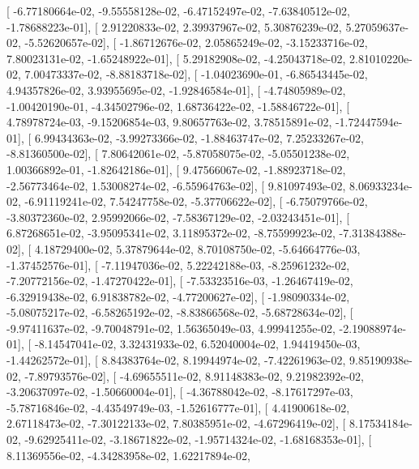 \documentclass{article}
\begin{document}
       [ -6.77180664e-02,  -9.55558128e-02,  -6.47152497e-02,
         -7.63840512e-02,  -1.78688223e-01],
       [  2.91220833e-02,   2.39937967e-02,   5.30876239e-02,
          5.27059637e-02,  -5.52620657e-02],
       [ -1.86712676e-02,   2.05865249e-02,  -3.15233716e-02,
          7.80023131e-02,  -1.65248922e-01],
       [  5.29182908e-02,  -4.25043718e-02,   2.81010220e-02,
          7.00473337e-02,  -8.88183718e-02],
       [ -1.04023690e-01,  -6.86543445e-02,   4.94357826e-02,
          3.93955695e-02,  -1.92846584e-01],
       [ -4.74805989e-02,  -1.00420190e-01,  -4.34502796e-02,
          1.68736422e-02,  -1.58846722e-01],
       [  4.78978724e-03,  -9.15206854e-03,   9.80657763e-02,
          3.78515891e-02,  -1.72447594e-01],
       [  6.99434363e-02,  -3.99273366e-02,  -1.88463747e-02,
          7.25233267e-02,  -8.81360500e-02],
       [  7.80642061e-02,  -5.87058075e-02,  -5.05501238e-02,
          1.00366892e-01,  -1.82642186e-01],
       [  9.47566067e-02,  -1.88923718e-02,  -2.56773464e-02,
          1.53008274e-02,  -6.55964763e-02],
       [  9.81097493e-02,   8.06933234e-02,  -6.91119241e-02,
          7.54247758e-02,  -5.37706622e-02],
       [ -6.75079766e-02,  -3.80372360e-02,   2.95992066e-02,
         -7.58367129e-02,  -2.03243451e-01],
       [  6.87268651e-02,  -3.95095341e-02,   3.11895372e-02,
         -8.75599923e-02,  -7.31384388e-02],
       [  4.18729400e-02,   5.37879644e-02,   8.70108750e-02,
         -5.64664776e-03,  -1.37452576e-01],
       [ -7.11947036e-02,   5.22242188e-03,  -8.25961232e-02,
         -7.20772156e-02,  -1.47270422e-01],
       [ -7.53323516e-03,  -1.26467419e-02,  -6.32919438e-02,
          6.91838782e-02,  -4.77200627e-02],
       [ -1.98090334e-02,  -5.08075217e-02,  -6.58265192e-02,
         -8.83866568e-02,  -5.68728634e-02],
       [ -9.97411637e-02,  -9.70048791e-02,   1.56365049e-03,
          4.99941255e-02,  -2.19088974e-01],
       [ -8.14547041e-02,   3.32431933e-02,   6.52040004e-02,
          1.94419450e-03,  -1.44262572e-01],
       [  8.84383764e-02,   8.19944974e-02,  -7.42261963e-02,
          9.85190938e-02,  -7.89793576e-02],
       [ -4.69655511e-02,   8.91148383e-02,   9.21982392e-02,
         -3.20637097e-02,  -1.50660004e-01],
       [ -4.36788042e-02,  -8.17617297e-03,  -5.78716846e-02,
         -4.43549749e-03,  -1.52616777e-01],
       [  4.41900618e-02,   2.67118473e-02,  -7.30122133e-02,
          7.80385951e-02,  -4.67296419e-02],
       [  8.17534184e-02,  -9.62925411e-02,  -3.18671822e-02,
         -1.95714324e-02,  -1.68168353e-01],
       [  8.11369556e-02,  -4.34283958e-02,   1.62217894e-02,
\end{document}
